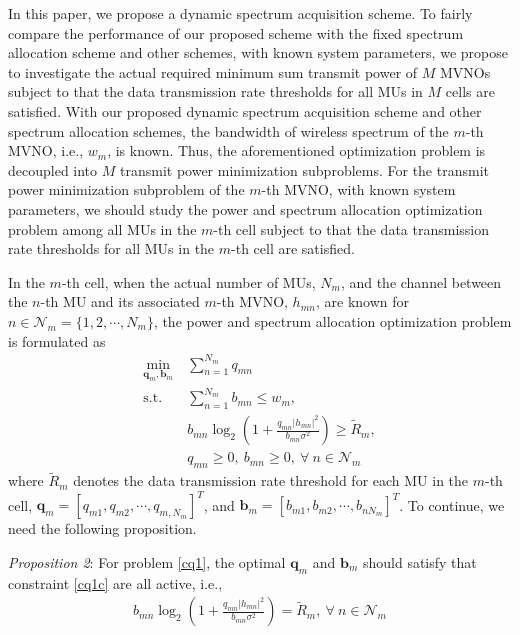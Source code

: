 \documentclass[journal]{IEEEtran}
\begin{document}
In this paper, we propose a dynamic spectrum acquisition scheme. To fairly compare the performance of our proposed scheme with the fixed spectrum allocation scheme and other schemes, with known system parameters, we propose to investigate the actual required minimum sum transmit power of $M$ MVNOs subject to that the data transmission rate thresholds for all MUs in $M$ cells are satisfied. With our proposed dynamic spectrum acquisition scheme and other spectrum allocation schemes, the bandwidth of wireless spectrum of the $m$-th MVNO, i.e., $w_m$, is known. Thus, the aforementioned optimization problem is decoupled into $M$ transmit power minimization subproblems. For the transmit power minimization subproblem of the $m$-th MVNO, with known system parameters, we should study the power and spectrum allocation optimization problem among all MUs in the $m$-th cell subject to that the data transmission rate thresholds for all MUs in the $m$-th cell are satisfied.

In the $m$-th cell, when the actual number of MUs, $N_m$, and the channel between the $n$-th MU and its associated $m$-th MVNO, $h_{mn}$, are known for $n\in\mathcal{N}_m=\{1,2,\cdots,N_m\}$, the power and spectrum allocation optimization problem is formulated as
\begin{subequations}\label{cq1}
\begin{align}
\label{cq1a} \min_{\mathbf{q}_m, \mathbf{b}_m}& \sum\limits_{n=1}^{N_m} q_{mn} \\
\label{cq1b}\mbox{s.t.} \quad &  \sum\limits_{n=1}^{N_m} b_{mn} \leq w_m,\\ \label{cq1c}&  b_{mn}\log_2\left(1 + \frac{q_{mn}\left|h_{mn}\right|^2}{b_{mn}\sigma^2}\right) \geq \tilde{R}_m,\\
\label{cq1d}& q_{mn} \geq 0,\ b_{mn} \geq 0,\ \forall\ n\in\mathcal{N}_m
\end{align}
\end{subequations}
where $\tilde{R}_m$ denotes the data transmission rate threshold for each
MU in the $m$-th cell, $\mathbf{q}_m=\left[q_{m1}, q_{m2}, \cdots, q_{m,N_m}\right]^T$, and $\mathbf{b}_m=\left[b_{m1}, b_{m2}, \cdots, b_{nN_m}\right]^T$. To continue, we need the following proposition.

\textit{Proposition 2}: For problem \eqref{cq1}, the optimal $\mathbf{q}_m$ and $\mathbf{b}_m$ should satisfy that constraint \eqref{cq1c} are all active, i.e.,
\begin{align}
b_{mn}\log_2\left(1 + \frac{q_{mn}\left|h_{mn}\right|^2}{b_{mn}\sigma^2}\right)= \tilde{R}_m,\  \forall \ n\in\mathcal{N}_m
\end{align}
\end{document}
